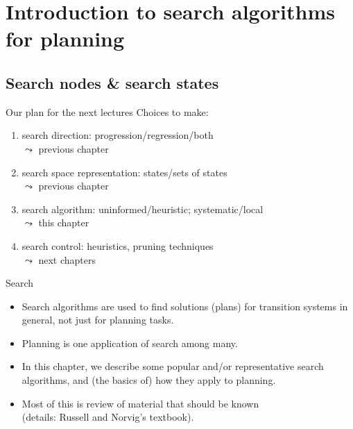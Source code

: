 \documentclass{gkibeamer}
\begin{document}
\subtitle{Planning as search: search algorithms}
\date{November 15th, 2011}
\maketitles

\section[Introduction]{Introduction to search algorithms for planning}
\subsection[Nodes and states]{Search nodes \& search states}

\begin{frame}{Our plan for the next lectures}
  Choices to make:
  \begin{enumerate}
  \item search direction: progression/regression/both
    \\ $\leadsto$ previous chapter
  \item search space representation: states/sets of states
    \\ $\leadsto$ previous chapter
  \item search algorithm: uninformed/heuristic; systematic/local
    \\ $\leadsto$ \alert{this chapter}
  \item search control: heuristics, pruning techniques
    \\ $\leadsto$ next chapters
  \end{enumerate}
\end{frame}

\begin{frame}{Search}
  \begin{itemize}
  \item Search algorithms are used to find solutions (plans) for
    \alert{transition systems} in general, not just for planning
    tasks.
  \item Planning is \alert{one application} of search among many.
  \item In this chapter, we describe some popular and/or
    representative search algorithms, and (the basics of) how they
    apply to planning.
  \item Most of this is review of material that should be known \\
    (details: Russell and Norvig's textbook).
  \end{itemize}
\end{frame}
\end{document}
